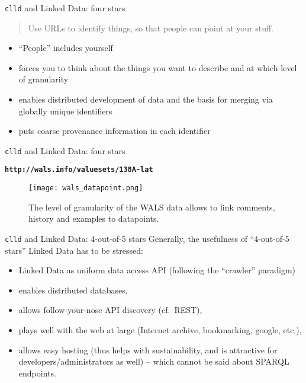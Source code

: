 \documentclass{beamer}
\begin{document}
\begin{frame}{\texttt{clld} and Linked Data: four stars}
\begin{quote}
Use URLs to identify things, so that people can point at your stuff.
\end{quote}
\begin{itemize}
\item ``People'' includes yourself
\item forces you to think about the things you want to describe and at which level of granularity
\item enables distributed development of data and the basis for merging via globally unique identifiers
\item puts coarse provenance information in each identifier

\end{itemize}
\end{frame}


\begin{frame}{\texttt{clld} and Linked Data: four stars}
\begin{center}
\bf\texttt{http://wals.info/valuesets/138A-lat}
\end{center}
\begin{figure}
\texttt{[image: wals\_datapoint.png]}
\caption{\label{fig:wals}The level of granularity of the WALS data allows to link comments, history and examples to datapoints.}
\end{figure}
\end{frame}


\begin{frame}{\texttt{clld} and Linked Data: 4-out-of-5 stars}
Generally, the usefulness of ``4-out-of-5 stars'' Linked Data has to be stressed:
\begin{itemize}
\item Linked Data as uniform data access API (following the ``crawler'' paradigm)
\item enables distributed databases,
\item allows follow-your-nose API discovery (cf.~REST),
\item plays well with the web at large (Internet archive, bookmarking, google, etc.),
\item allows easy hosting (thus helps with sustainability, and is attractive for developers/administrators as well) -- which cannot be said about SPARQL endpoints.
\end{itemize}
\end{frame}
\end{document}
